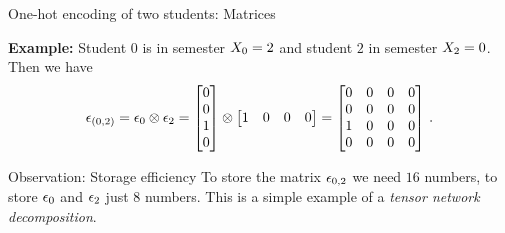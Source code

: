 \documentclass{beamer}
\begin{document}
%
%



    \begin{frame}{One-hot encoding of two students: Matrices}

        \textbf{Example:} Student $0$ is in semester $X_{0}=2$ and student $2$ in semester $X_{2}=0$.
        Then we have
        \begin{align}
            \epsilon_{(0,2)}
            = \epsilon_{0} \otimes \epsilon_{2} =
            \begin{bmatrix}
                0 \\ 0 \\ 1 \\ 0
            \end{bmatrix}
            \otimes
            \begin{bmatrix}
                1 & 0 & 0 & 0
            \end{bmatrix}
            =
            \begin{bmatrix}
                0 & 0 & 0 & 0 \\
                0 & 0 & 0 & 0 \\
                1 & 0 & 0 & 0 \\
                0 & 0 & 0 & 0
            \end{bmatrix} \, .
        \end{align}

        \begin{block}{Observation: Storage efficiency}
            To store the matrix $\epsilon_{0,2}$ we need $16$ numbers, to store $\epsilon_{0}$ and $\epsilon_{2}$ just $8$ numbers.
            This is a simple example of a \emph{tensor network decomposition}.
        \end{block}

    \end{frame}
\end{document}
